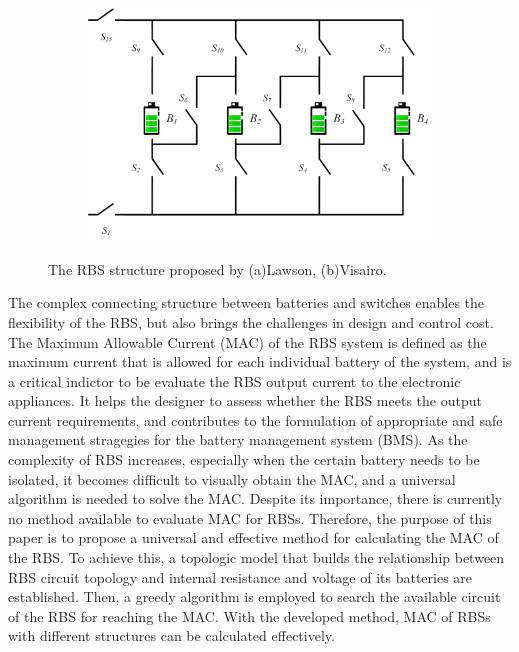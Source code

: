\documentclass{article}
\begin{document}
\begin{figure}[htbp]
\begin{subfigure}[b]{0.15\textwidth}
        \caption{}
        \label{fig:arch-f}
    \end{subfigure}
    \hspace{0.05\textwidth}
    \begin{subfigure}[b]{0.45\textwidth}
        \includegraphics[width=\textwidth]{../attachments/arch-f.png}
        \caption{}
        \label{fig:arch-e}
    \end{subfigure}
    \caption{The RBS structure proposed by (a)Lawson\cite{lawsonSoftwareConfigurableBattery2012}, (b)Visairo\cite{visairoReconfigurableBatteryPack2008}.}
    \label{fig:arch}
\end{figure}

The complex connecting structure between batteries and switches enables the flexibility of the RBS, but also brings the challenges in design and control cost.
The Maximum Allowable Current (MAC) of the RBS system is defined as the maximum current that is allowed for each individual battery of the system, and is a critical indictor to be evaluate the RBS output current to the electronic appliances.
It helps the designer to assess whether the RBS meets the output current requirements, and contributes to the formulation of appropriate and safe management stragegies for the battery management system (BMS).
As the complexity of RBS increases, especially when the certain battery needs to be isolated, it becomes difficult to visually obtain the MAC, and a universal algorithm is needed to solve the MAC.
Despite its importance, there is currently no method available to evaluate MAC for RBSs.
Therefore, the purpose of this paper is to propose a universal and effective method for calculating the MAC of the RBS.
To achieve this, a topologic model that builds the relationship between RBS circuit topology and internal resistance and voltage of its batteries are established.
Then, a greedy algorithm is employed to search the available circuit of the RBS for reaching the MAC.
With the developed method, MAC of RBSs with different structures can be calculated effectively.
\end{document}
